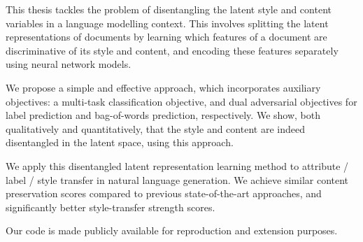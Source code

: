 This thesis tackles the problem of disentangling the latent style and content variables in a language modelling context. This involves splitting the latent representations of documents by learning which features of a document are discriminative of its style and content, and encoding these features separately using neural network models.

We propose a simple and effective approach, which incorporates auxiliary objectives: a multi-task classification objective, and dual adversarial objectives for label prediction and bag-of-words prediction, respectively. We show, both qualitatively and quantitatively, that the style and content are indeed disentangled in the latent space, using this approach.

We apply this disentangled latent representation learning method to attribute / label / style transfer in natural language generation. We achieve similar content preservation scores compared to previous state-of-the-art approaches, and significantly better style-transfer strength scores.

Our code is made publicly available for reproduction and extension purposes.

